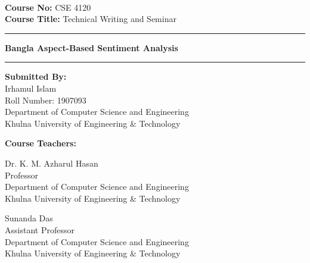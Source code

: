 \documentclass[a4paper,12pt]{article}
\begin{document}
\begin{titlepage}

    \centering
    \Large
    \\
    \vspace{0.3in}
    \centering
    \Large
    \textbf{Course No:} CSE 4120 \\
    \textbf{Course Title:} Technical Writing and Seminar
    
    \vspace{0.3in}
    \Huge
    \rule{\textwidth}{0.4pt}
    \textbf{Bangla Aspect-Based Sentiment Analysis}
    \rule{\textwidth}{0.4pt}

    \vspace{0.5in}
    \Large
    \textbf{Submitted By:} \\
    Irhamul Islam \\
    Roll Number: 1907093 \\
    Department of Computer Science and Engineering \\
    Khulna University of Engineering \& Technology

    \vspace{0.5in}
    \textbf{Course Teachers:}

    \vspace{0.2in}
    \begin{minipage}{0.49\textwidth}
        \raggedright
        Dr. K. M. Azharul Hasan \\
        Professor \\
        Department of Computer Science and Engineering \\
        Khulna University of Engineering \& Technology
    \end{minipage}
    \hfill
    \begin{minipage}{0.49\textwidth}
        \raggedleft
        Sunanda Das \\
        Assistant Professor \\
        Department of Computer Science and Engineering \\
        Khulna University of Engineering \& Technology
    \end{minipage}

    \vfill
\end{titlepage}
\end{document}
